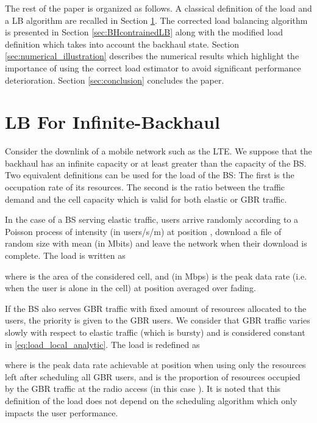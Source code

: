 \documentclass[10pt,draftclsnofoot,onecolumn]{IEEEtran}
\begin{document}
The rest of the paper is organized as follows. A classical
definition of the load and a \ac{LB} algorithm
are recalled in Section \ref{sec:legacyLB}. The corrected load
balancing algorithm is presented in Section \ref{sec:BHcontrainedLB}
along with the modified load definition which takes into account the
backhaul state. Section \ref{sec:numerical_illustration} describes
the numerical results which highlight the importance of using the
correct load estimator to avoid significant performance
deterioration. Section \ref{sec:conclusion} concludes the paper.


\section{\ac{LB} For Infinite-Backhaul} \label{sec:legacyLB}

Consider the downlink of a mobile network such as the \ac{LTE}. We
suppose that the backhaul has an infinite capacity or at least
greater than the capacity of the \ac{BS}. Two equivalent definitions
can be used for the load of the \ac{BS}: The first is  the
occupation rate of its resources. The second is the ratio between
the traffic demand and the cell capacity which is valid for both
elastic or \ac{GBR} traffic.


In the case of a \ac{BS} serving elastic traffic, users arrive
randomly according to a Poisson process of intensity  (in users/s/m) at position ,
download a file of random size  with mean  (in Mbits) and
leave the network when their download is complete. The load is
written as \cite{bonald_wirelessdownlinkdata_2003a}

    
where  is the area of the considered cell, 
and  (in Mbps) is the peak data rate (i.e. when the user is 
alone in the cell) at position  averaged over fading.

If the \ac{BS} also serves \ac{GBR} traffic with fixed amount of
resources allocated to the users, the priority is
given to the \ac{GBR} users. 
We consider that \ac{GBR} traffic varies slowly with respect 
to elastic traffic (which is bursty) and is considered constant in \eqref{eq:load_local_analytic}.
The load is redefined as

    
where  is the peak data rate achievable at position 
when using only the resources left after scheduling all \ac{GBR}
users, and  is the proportion of resources occupied
by the \ac{GBR} traffic at the radio access (in this case ). 
It is noted that this definition
of the load does not depend on the scheduling algorithm which
only impacts the user performance.
\end{document}

